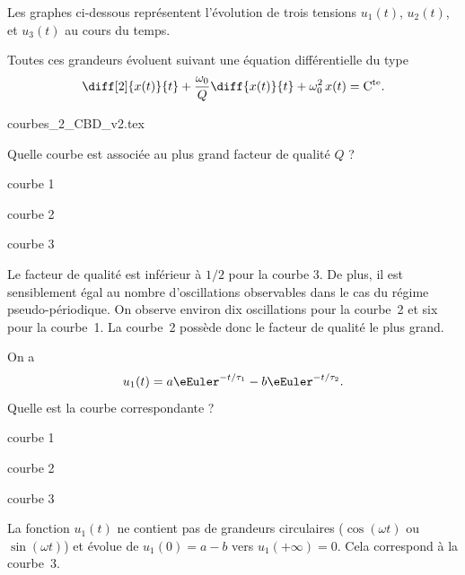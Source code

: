 Les graphes ci-dessous représentent l'évolution de trois tensions $u_1(t)$, $u_2(t)$, et $u_3(t)$ au cours du temps. 

Toutes ces grandeurs évoluent suivant une équation différentielle du type 
\[
\diff[2]{x(t)}{t} + \frac{\omega_0}{Q} \diff{x(t)}{t} + \omega_0^2\, x(t) =\mathrm{C^{te}}.
\]

{courbes_2_CBD_v2.tex}


\debutEntrainement



\begin{enonce}
Quelle courbe est associée au plus grand facteur de qualité $Q$ ?
\begin{listeQCM3Colonnes}
\item courbe 1
\item courbe 2
\item courbe 3
\end{listeQCM3Colonnes}
\end{enonce}
\reponse{\reponseB}
\begin{corrige}
Le facteur de qualité est inférieur à $1/2$ pour la courbe 3. De plus, il est sensiblement égal au nombre d'oscillations observables dans le cas du régime pseudo-périodique. On observe environ dix oscillations pour la courbe~2 et six pour la courbe~1. La courbe~2 possède donc le facteur de qualité le plus grand.
\end{corrige}




\begin{enonce}
On a 
\[
u_1(t)=a\eEuler^{-t/\tau_1}-b\eEuler^{-t/\tau_2}.
\]
 Quelle est la courbe correspondante ?
\begin{listeQCM3Colonnes}
\item courbe 1
\item courbe 2
\item courbe 3
\end{listeQCM3Colonnes}
\end{enonce}
\reponse{\reponseC}
\begin{corrige}
La fonction $u_1(t)$ ne contient pas de grandeurs circulaires ($\cos(\omega t)$ ou $\sin(\omega t)$) et évolue de $u_1(0)=a-b$ vers $u_1(+\infty)=0$. Cela correspond à la courbe~3.
\end{corrige}

